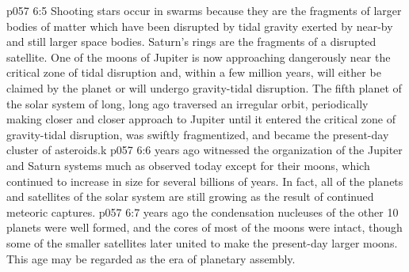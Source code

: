 \vs p057 6:5 Shooting stars occur in swarms because they are the fragments of larger bodies of matter which have been disrupted by tidal gravity exerted by near\hyp{}by and still larger space bodies. Saturn’s rings are the fragments of a disrupted satellite. One of the moons of Jupiter is now approaching dangerously near the critical zone of tidal disruption and, within a few million years, will either be claimed by the planet or will undergo gravity\hyp{}tidal disruption. The fifth planet of the solar system of long, long ago traversed an irregular orbit, periodically making closer and closer approach to Jupiter until it entered the critical zone of gravity\hyp{}tidal disruption, was swiftly fragmentized, and became the present\hyp{}day cluster of asteroids.k
\vs p057 6:6 \pc {} years ago witnessed the organization of the Jupiter and Saturn systems much as observed today except for their moons, which continued to increase in size for several billions of years. In fact, all of the planets and satellites of the solar system are still growing as the result of continued meteoric captures.
\vs p057 6:7 \pc {} years ago the condensation nucleuses of the other 10 planets were well formed, and the cores of most of the moons were intact, though some of the smaller satellites later united to make the present\hyp{}day larger moons. This age may be regarded as the era of planetary assembly.
